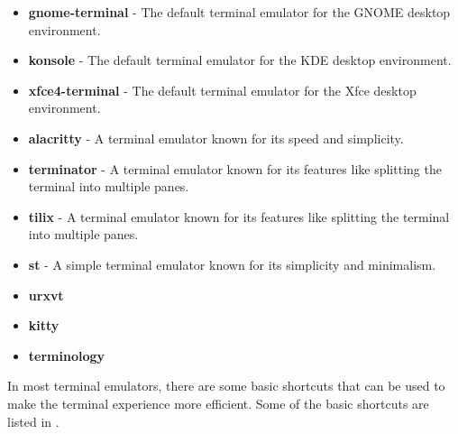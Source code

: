 \begin{itemize}
  \item
    \textbf{gnome-terminal} - The default terminal emulator for the GNOME desktop environment.
  \item
    \textbf{konsole} - The default terminal emulator for the KDE desktop environment.
  \item
    \textbf{xfce4-terminal} - The default terminal emulator for the Xfce desktop environment.
  \item
    \textbf{alacritty} - A terminal emulator known for its speed and simplicity.
  \item
    \textbf{terminator} - A terminal emulator known for its features like splitting the terminal into multiple panes.
  \item
    \textbf{tilix} - A terminal emulator known for its features like splitting the terminal into multiple panes.
  \item
    \textbf{st} - A simple terminal emulator known for its simplicity and minimalism.
  \item \textbf{urxvt}
  \item \textbf{kitty}
  \item \textbf{terminology}
\end{itemize}

In most terminal emulators, there are some basic shortcuts that can be used to make the terminal experience more efficient.
Some of the basic shortcuts are listed in .

